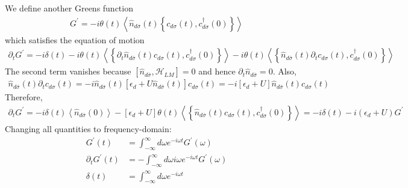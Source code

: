 \documentclass[twoside,11pt]{report}
\numberwithin{equation}{section}
\begin{document}
We define another Greens function
\begin{equation}\begin{aligned}
	G^\prime = -i \theta(t) \left<\hat n_{d\overline\sigma}(t)\left\{c_{d\sigma}(t), c^\dagger_{d\sigma}(0) \right\} \right>
\end{aligned}\end{equation}
which satisfies the equation of motion
\begin{equation}\begin{aligned}
	\partial_t G^\prime = -i \delta(t) -i\theta(t) \left<\left\{\partial_t \hat n_{d\overline\sigma}(t)c_{d\sigma}(t), c^\dagger_{d\sigma}(0) \right\} \right> -i\theta(t) \left<\left\{\hat n_{d\overline\sigma}(t)\partial_t c_{d\sigma}(t), c^\dagger_{d\sigma}(0) \right\} \right>
\end{aligned}\end{equation}
The second term vanishes because \(\left[\hat n_{d\overline\sigma}, \mathcal{H}_{LM}\right] = 0\) and hence \(\partial_t \hat n_{d\overline\sigma} = 0\). Also,
\begin{equation}\begin{aligned}
	\hat n_{d\overline\sigma}(t)\partial_t c_{d\sigma}(t) = -i\hat n_{d\overline\sigma}(t)\left[\epsilon_d + U \hat n_{d\overline\sigma}(t)\right]c_{d\sigma}(t) = -i\left[\epsilon_d + U\right]\hat n_{d\overline\sigma}(t)c_{d\sigma}(t)
\end{aligned}\end{equation}
Therefore,
\begin{equation}\begin{aligned}
	\partial_t G^\prime = -i \delta(t) \left< \hat n_{d\overline\sigma}(0)\right>- \left[\epsilon_d + U\right]\theta(t) \left<\left\{\hat n_{d\overline\sigma}(t)c_{d\sigma}(t), c^\dagger_{d\sigma}(0) \right\} \right> = -i \delta(t) -i \left( \epsilon_d + U \right) G^\prime
\end{aligned}\end{equation}
Changing all quantities to frequency-domain:
\begin{equation}\begin{aligned}
	G^\prime(t) &= \int_{-\infty}^\infty d\omega e^{-i\omega t} G^\prime(\omega)\\
	\partial_t G^\prime(t) &= -\int_{-\infty}^\infty d\omega i \omega e^{-i\omega t} G^\prime(\omega)\\
	\delta(t) &= \int_{-\infty}^\infty d\omega e^{-i\omega t}
\end{aligned}\end{equation}
\end{document}
